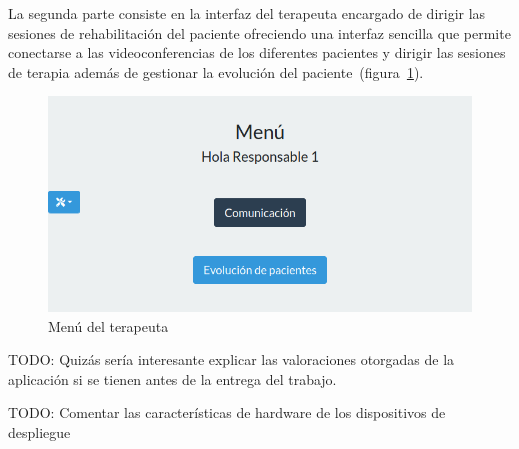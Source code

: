 La segunda parte consiste en la interfaz del terapeuta encargado de dirigir las sesiones de rehabilitación del paciente ofreciendo una interfaz sencilla que permite conectarse a las videoconferencias de los diferentes pacientes y dirigir las sesiones de terapia además de gestionar la evolución del paciente~(figura~\ref{fig:menu_respon}).

\begin{figure}
	\centering
	\includegraphics[width=\textwidth]{img/menu_responsable.png}
	\caption{Menú del terapeuta}
	\label{fig:menu_respon}
\end{figure}


TODO: Quizás sería interesante explicar las valoraciones otorgadas de la aplicación si se tienen antes de la entrega del trabajo. 

TODO: Comentar las características de hardware de los dispositivos de despliegue